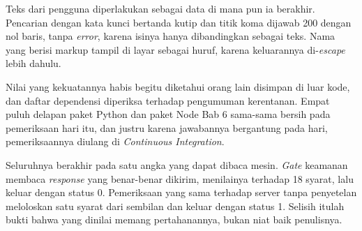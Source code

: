 Teks dari pengguna diperlakukan sebagai data di mana pun ia berakhir.
Pencarian dengan kata kunci bertanda kutip dan titik koma dijawab 200 dengan
nol baris, tanpa \textit{error}, karena isinya hanya dibandingkan sebagai
teks. Nama yang berisi markup tampil di layar sebagai huruf, karena
keluarannya di-\textit{escape} lebih dahulu.

Nilai yang kekuatannya habis begitu diketahui orang lain disimpan di luar
kode, dan daftar dependensi diperiksa terhadap pengumuman kerentanan. Empat
puluh delapan paket Python dan paket Node Bab 6 sama-sama bersih pada
pemeriksaan hari itu, dan justru karena jawabannya bergantung pada hari,
pemeriksaannya diulang di \textit{Continuous Integration}.

Seluruhnya berakhir pada satu angka yang dapat dibaca mesin. \textit{Gate} keamanan
membaca \textit{response} yang benar-benar dikirim, menilainya terhadap 18
syarat, lalu keluar dengan status 0. Pemeriksaan yang sama terhadap server
tanpa penyetelan meloloskan satu syarat dari sembilan dan keluar dengan
status 1. Selisih itulah bukti bahwa yang dinilai memang pertahanannya, bukan
niat baik penulisnya.

